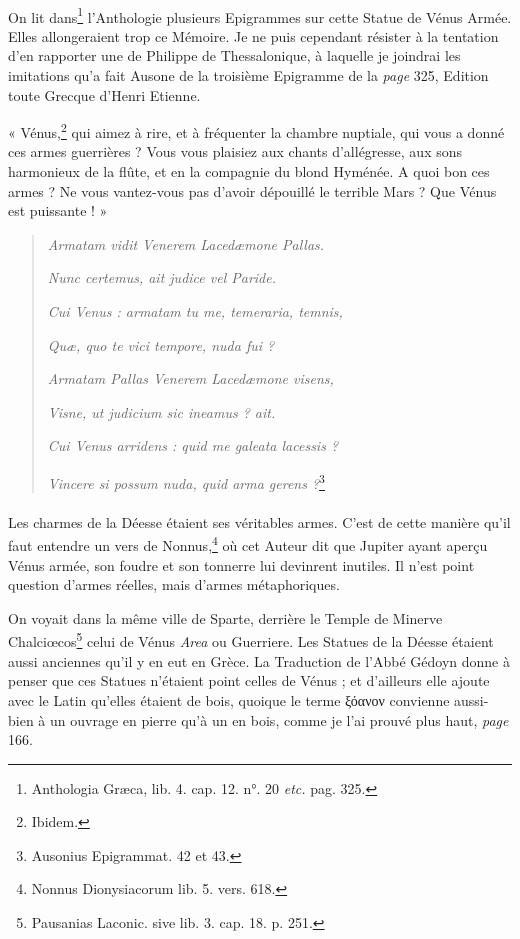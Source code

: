 \documentclass[a4paper, 18pt, oneside]{article}
\begin{document}
\paragraph{}
On lit dans\footnote{Anthologia Græca, lib. 4. cap. 12. n°. 20 \emph{etc.} pag. 325.} l'Anthologie plusieurs Epigrammes sur cette Statue de Vénus Armée. Elles allongeraient trop ce Mémoire. Je ne puis cependant résister à la tentation d'en rapporter une de Philippe de Thessalonique, à laquelle je joindrai les imitations qu'a fait Ausone de la troisième Epigramme de la \emph{page} 325, Edition toute Grecque d'Henri Etienne.

« Vénus,\footnote{Ibidem.} qui aimez à rire, et à fréquenter la chambre nuptiale, qui vous a donné ces armes guerrières ? Vous vous plaisiez aux chants d'allégresse, aux sons harmonieux de la flûte, et en la compagnie du blond Hyménée. A quoi bon ces armes ? Ne vous vantez-vous pas d'avoir dépouillé le terrible Mars ? Que Vénus est puissante ! »
\begin{quotation}
\emph{Armatam vidit Venerem Lacedæmone Pallas.}

\hspace*{5mm}\emph{Nunc certemus, ait judice vel Paride.}

\emph{Cui Venus : armatam tu me, temeraria, temnis,}

\hspace*{5mm}\emph{Quæ, quo te vici tempore, nuda fui ?}

\emph{Armatam Pallas Venerem Lacedæmone visens,}

\hspace*{5mm}\emph{Visne, ut judicium sic ineamus ? ait.}

\emph{Cui Venus arridens : quid me galeata lacessis ?}

\hspace*{5mm}\emph{Vincere si possum nuda, quid arma gerens ?}\footnote{Ausonius Epigrammat. 42 et 43.}
\end{quotation}
\paragraph{}
Les charmes de la Déesse étaient ses véritables armes. C'est de cette manière qu'il faut entendre un vers de Nonnus,\footnote{Nonnus Dionysiacorum lib. 5. vers. 618.} où cet Auteur dit que Jupiter ayant aperçu Vénus armée, son foudre et son tonnerre lui devinrent inutiles. Il n'est point question d'armes réelles, mais d'armes métaphoriques.

On voyait dans la même ville de Sparte, derrière le Temple de Minerve Chalciœcos\footnote{Pausanias Laconic. sive lib. 3. cap. 18. p. 251.} celui de Vénus \emph{Area} ou Guerriere. Les Statues de la Déesse étaient aussi anciennes qu'il y en eut en Grèce. La Traduction de l'Abbé Gédoyn donne à penser que ces Statues n'étaient point celles de Vénus ; et d'ailleurs elle ajoute avec le Latin qu'elles étaient de bois, quoique le terme ξόανον convienne aussi-bien à un ouvrage en pierre qu'à un en bois, comme je l'ai prouvé plus haut, \emph{page} 166.
\end{document}
